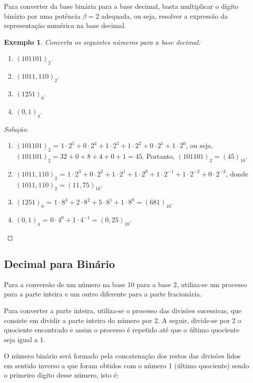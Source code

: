 \documentclass[
	12pt,				%
	openright,			%
	twoside,			%
	a4paper,			%
	english,			%
	french,				%
	brazil,				%
	sumario=tradicional
]{abntex2}
\newtheorem{example}{Exemplo}
\newenvironment{solution}{
	\begin{proof}[Solução]
}{\end{proof}}
\numberwithin{example}{chapter}
\numberwithin{remark}{chapter}
\numberwithin{definition}{chapter}
\numberwithin{figure}{chapter}
\begin{document}
Para converter da base binária para a base decimal, basta multiplicar o dígito binário por uma potência $\beta=2$ adequada, ou seja, resolver a expressão da representação numérica na base decimal.

\begin{example}
    Converta os seguintes números para a base decimal:
    \begin{enumerate}
        \item $(101101)_{2}$.
        \item $(1011,110)_{2}$.
        \item $(1251)_{8}$.
        \item $(0,1)_{4}$.
    \end{enumerate}
\end{example}
\begin{solution}\hfill
    \begin{enumerate}
        \item $(101101)_{2}$ = $1\cdot 2^5 + 0\cdot 2^4 + 1 \cdot 2^3 + 1 \cdot 2^2 + 0\cdot 2^1 + 1\cdot 2^0$, ou seja, $(101101)_{2} = 32 + 0 + 8 + 4 + 0 + 1 = 45$. Portanto, $(101101)_{2}=(45)_{10}$.
        \item $(1011,110)_{2}$ = $1\cdot 2^3 + 0 \cdot 2^2 + 1 \cdot 2^1 + 1 \cdot 2^0 + 1 \cdot 2^{-1} + 1\cdot 2^{-2} + 0 \cdot 2^{-3}$, donde $(1011,110)_{2}=(11,75)_{10}$.
        \item $(1251)_{8}$ = $1\cdot 8^3 + 2 \cdot 8^2 + 5\cdot 8^1 + 1\cdot 8^0 = (681)_{10}$.
        \item $(0,1)_{4}$ = $0\cdot 4^0 + 1 \cdot 4^{-1}=(0,25)_{10}$.
    \end{enumerate}
\end{solution}

\subsection{Decimal para Binário}

Para a conversão de um número na base 10 para a base 2, utiliza-se um processo para a parte inteira e um outro diferente para a parte fracionária.

Para converter a parte inteira, utiliza-se o processo das divisões sucessivas, que consiste em dividir a parte inteira do número por 2. A seguir, divide-se por 2 o quociente encontrado e assim o processo é repetido até que o último quociente seja igual a 1. 

O número binário será formado pela concatenação dos restos das divisões lidos em sentido inverso a que foram obtidos com o número 1 (último quociente) sendo o primeiro digito desse número, isto é:
\newpage
\end{document}
